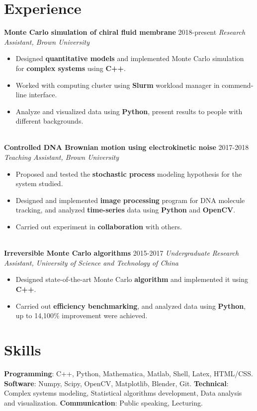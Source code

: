\documentclass[11pt,letterpaper]{article}
\begin{document}
\section*{Experience}
\textbf{Monte Carlo simulation of chiral fluid membrane} \hfill 2018-present \newline
\emph{Research Assistant, Brown University}
\begin{itemize}
    \item Designed \textbf{quantitative models} and implemented Monte Carlo simulation for \textbf{complex systems} using \textbf{C++}.
    \item Worked with computing cluster using \textbf{Slurm} workload manager in commend-line interface.
    \item Analyze and visualized data using \textbf{Python}, present results to people with different backgrounds.
\end{itemize}
~\\
\textbf{Controlled DNA Brownian motion using electrokinetic noise} \hfill 2017-2018 \newline
\emph{Teaching Assistant, Brown University}
\begin{itemize}
    \item Proposed and tested the \textbf{stochastic process} modeling hypothesis for the system studied.
    \item Designed and implemented \textbf{image processing} program for DNA molecule tracking, and analyzed \textbf{time-series} data using \textbf{Python} and \textbf{OpenCV}.
    \item Carried out experiment in \textbf{collaboration} with others.
\end{itemize}
~\\
\textbf{Irreversible Monte Carlo algorithms} \hfill 2015-2017 \newline
\emph{Undergraduate Research Assistant, University of Science and Technology of China}
\begin{itemize}
    \item Designed state-of-the-art Monte Carlo \textbf{algorithm} and implemented it using \textbf{C++}.
    \item Carried out \textbf{efficiency benchmarking}, and analyzed data using \textbf{Python}, up to 14,100\% improvement were achieved.
\end{itemize}
\section*{Skills}
\textbf{Programming}: C++, Python, Mathematica, Matlab, Shell, Latex, HTML/CSS. \newline
\textbf{Software}: Numpy, Scipy, OpenCV, Matplotlib, Blender, Git. \newline
\textbf{Technical}: Complex systems modeling, Statistical algorithms development, Data analysis and visualization. \newline
\textbf{Communication}: Public speaking, Lecturing.
\end{document}
